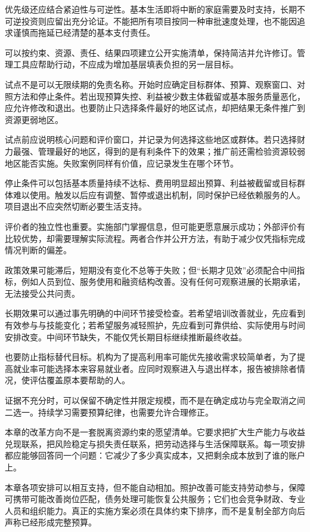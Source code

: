 \documentclass[UTF8,fontset=fandol,zihao=-4,oneside,openany]{ctexbook}
\begin{document}
优先级还应结合紧迫性与可逆性。基本生活即将中断的家庭需要及时支持，长期不可逆投资则应留出充分论证。不能把所有项目按同一种审批速度处理，也不能因追求谨慎而拖延已经清楚的基本支付责任。

可以按约束、资源、责任、结果四项建立公开实施清单，保持简洁并允许修订。管理工具应帮助行动，不应成为增加基层填表负担的另一层目标。

试点不是可以无限续期的免责名称。开始时应确定目标群体、预算、观察窗口、对照方法和停止条件。若出现预算失控、利益被少数主体截留或基本服务质量恶化，应允许修改和退出。也要防止只选择条件最好的地区试点，却把结果无条件推广到资源更弱地区。

\label{arg:P278}
试点前应说明核心问题和评价窗口，并记录为何选择这些地区或群体。若只选择财力最强、管理最好的地区，得到的是有利条件下的效果；推广前还需检验资源较弱地区能否实施。失败案例同样有价值，应记录发生在哪个环节。

停止条件可以包括基本质量持续不达标、费用明显超出预算、利益被截留或目标群体难以使用。触发以后应有调整、暂停或退出机制，同时保护已经依赖服务的人。项目退出不应突然切断必要生活支持。

评价者的独立性也重要。实施部门掌握信息，但可能更愿意展示成功；外部评价有比较优势，却需要理解实际流程。两者合作并公开方法，有助于减少仅凭指标完成情况判断的偏差。

政策效果可能滞后，短期没有变化不总等于失败；但“长期才见效”必须配合中间指标，例如人员到位、服务使用和融资结构改善。没有任何可观察进展的长期承诺，无法接受公共问责。

\label{arg:P279}
长期效果可以通过事先明确的中间环节接受检查。若希望培训改善就业，先应看到有效参与与技能变化；若希望服务减轻照护，先应看到可靠供给、实际使用与时间安排改变。中间环节缺失，不能仅凭长期目标继续推断最终收益。

也要防止指标替代目标。机构为了提高利用率可能优先接收需求较简单者，为了提高就业率可能选择本来容易就业者。应同时观察进入与退出样本，报告被排除者情况，使评估覆盖原本要帮助的人。

证据不充分时，可以保留不确定性并限定规模，而不是在确定成功与完全取消之间二选一。持续学习需要预算纪律，也需要允许合理修正。

本章的改革方向不是一套脱离资源约束的愿望清单。它要求把扩大生产能力与收益兑现联系，把风险稳定与损失责任联系，把劳动选择与生活保障联系。每一项安排都应能够回答同一个问题：它减少了多少真实成本，又把剩余成本放到了谁的账户上。

\label{arg:P280}
本章各项安排可以相互支持，但不能自动相加。照护改善可能支持劳动参与，保障可携带可能改善岗位匹配，债务处理可能恢复公共服务；它们也会竞争财政、专业人员和组织能力。真正的实施方案必须在具体约束下排序，而不是复制全部方向后声称已经形成完整预算。
\end{document}
